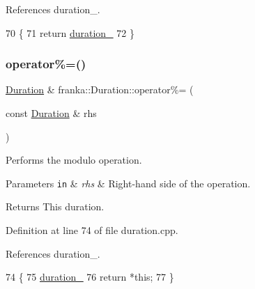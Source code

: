 References duration\+\_\+.


\begin{DoxyCode}
70                                                         \{
71   \textcolor{keywordflow}{return} \hyperlink{classfranka_1_1Duration_ae446c403b200f0dbf92fb51ca21e82ff}{duration\_} %
72 \}
\end{DoxyCode}
\mbox{\label{classfranka_1_1Duration_aed73021c4abece659dd184b95ee27c90}} 
\subsubsection{\texorpdfstring{operator\%=()}{operator\%=()}\hspace{0.1cm}{\footnotesize\ttfamily [1/2]}}
{\footnotesize\ttfamily \hyperlink{classfranka_1_1Duration}{Duration} \& franka\+::\+Duration\+::operator\%= (\begin{DoxyParamCaption}\item[{const \hyperlink{classfranka_1_1Duration}{Duration} \&}]{rhs }\end{DoxyParamCaption})\hspace{0.3cm}{\ttfamily [noexcept]}}

Performs the modulo operation.


\begin{DoxyParams}[1]{Parameters}
\mbox{\tt in}  & {\em rhs} & Right-\/hand side of the operation.\\
\hline
\end{DoxyParams}
\begin{DoxyReturn}{Returns}
This duration. 
\end{DoxyReturn}


Definition at line 74 of file duration.\+cpp.



References duration\+\_\+.


\begin{DoxyCode}
74                                                            \{
75   \hyperlink{classfranka_1_1Duration_ae446c403b200f0dbf92fb51ca21e82ff}{duration\_} %
76   \textcolor{keywordflow}{return} *\textcolor{keyword}{this};
77 \}
\end{DoxyCode}
\mbox{\label{classfranka_1_1Duration_aa917a142ad452b02fd66fbdda63ac99d}} 
